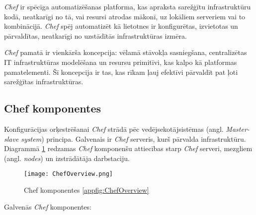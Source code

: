 \textit{Chef} ir spēcīga automatizēšanas platforma, kas apraksta sarežģītu infrastruktūru kodā, neatkarīgi no tā, vai resursi atrodas mākonī, uz lokāliem serveriem vai to kombinācijā. \textit{Chef} spēj automatizēt kā lietotnes ir konfigurētas, izvietotas un pārvaldītas, neatkarīgi no uzstādītās infrastruktūras izmēra.

\textit{Chef} pamatā ir vienkārša koncepcija: vēlamā stāvokļa sasniegšana, centralizētas IT infrastruktūras modelēšana un resursu primitīvi, kas kalpo kā platformas pamatelementi. Šī koncepcija ir tas, kas rīkam ļauj efektīvi pārvaldīt pat ļoti sarežģītas infrastruktūras. \cite[Getting Started]{chef-docs}
\subsection{Chef komponentes}
Konfigurācijas orķestrēšanai \textit{Chef} strādā pēc vedējsekotājsistēmas (angl. \textit{Master-slave system}) principa. Galvenais ir \textit{Chef} serveris, kurš pārvalda infrastruktūru.
Diagrammā \ref{fig:ChefOverview} redzamas \textit{Chef} komponenšu attiecības starp \textit{Chef} serveri, mezgliem (angl. \textit{nodes}) un izstrādātāja darbstaciju. \cite[Overview]{chef-docs}
\begin{figure}[H]%
	\centering
	\captionsetup{justification=centering}
	\texttt{[image: ChefOverview.png]}
	\caption{Chef komponentes \ref{appfig:ChefOverview}}
	\label{fig:ChefOverview}
\end{figure}
Galvenās \textit{Chef} komponentes:
